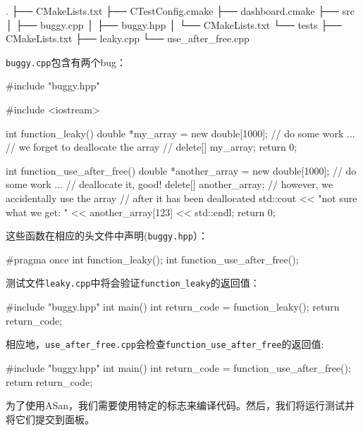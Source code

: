 \begin{codebox}[shell]
.
├── CMakeLists.txt
├── CTestConfig.cmake
├── dashboard.cmake
├── src
│    ├── buggy.cpp
│    ├── buggy.hpp
│    └── CMakeLists.txt
└── tests
    ├── CMakeLists.txt
    ├── leaky.cpp
    └── use_after_free.cpp
\end{codebox}

\texttt{buggy.cpp}包含有两个bug：

\begin{codebox}[cpp]
#include "buggy.hpp"

#include <iostream>

int function_leaky() {
  double *my_array = new double[1000];
  // do some work ...
  // we forget to deallocate the array
  // delete[] my_array;
  return 0;
}

int function_use_after_free() {
  double *another_array = new double[1000];
  // do some work ...
  // deallocate it, good!
  delete[] another_array;
  // however, we accidentally use the array
  // after it has been deallocated
  std::cout << "not sure what we get: " << another_array[123] << std::endl;
  return 0;
}
\end{codebox}

这些函数在相应的头文件中声明(\texttt{buggy.hpp}）：

\begin{codebox}[cpp]
#pragma once
int function_leaky();
int function_use_after_free();
\end{codebox}

测试文件\texttt{leaky.cpp}中将会验证\texttt{function\_leaky}的返回值：

\begin{codebox}[cpp]
#include "buggy.hpp"
int main() {
  int return_code = function_leaky();
  return return_code;
}
\end{codebox}

相应地，\texttt{use\_after\_free.cpp}会检查\texttt{function\_use\_after\_free}的返回值:

\begin{codebox}[cpp]
#include "buggy.hpp"
int main() {
  int return_code = function_use_after_free();
  return return_code;
}
\end{codebox}


为了使用ASan，我们需要使用特定的标志来编译代码。然后，我们将运行测试并将它们提交到面板。

